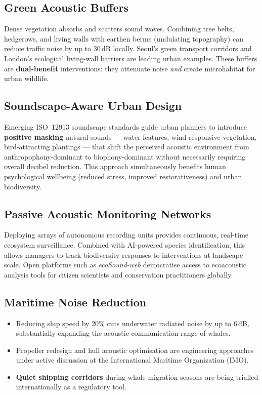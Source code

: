 \documentclass[12pt, a4paper]{article}
\begin{document}
\subsection{Green Acoustic Buffers}

Dense vegetation absorbs and scatters sound waves. Combining tree belts, hedgerows, and
living walls with earthen berms (undulating topography) can reduce traffic noise by up to
30\,dB locally. Seoul's green transport corridors and London's ecological living-wall barriers
are leading urban examples. These buffers are \textbf{dual-benefit} interventions: they
attenuate noise \textit{and} create microhabitat for urban wildlife.

\subsection{Soundscape-Aware Urban Design}

Emerging ISO~12913 soundscape standards guide urban planners to introduce \textbf{positive
masking} natural sounds --- water features, wind-responsive vegetation, bird-attracting
plantings --- that shift the perceived acoustic environment from anthropophony-dominant to
biophony-dominant without necessarily requiring overall decibel reduction. This approach
simultaneously benefits human psychological wellbeing (reduced stress, improved restorativeness)
and urban biodiversity.

\subsection{Passive Acoustic Monitoring Networks}

Deploying arrays of autonomous recording units provides continuous, real-time ecosystem
surveillance. Combined with AI-powered species identification, this allows managers to track
biodiversity responses to interventions at landscape scale. Open platforms such as
\textit{ecoSound-web} democratise access to ecoacoustic analysis tools for citizen scientists
and conservation practitioners globally.

\subsection{Maritime Noise Reduction}

\begin{itemize}[itemsep=3pt]
  \item Reducing ship speed by 20\% cuts underwater radiated noise by up to 6\,dB, substantially
        expanding the acoustic communication range of whales.
  \item Propeller redesign and hull acoustic optimisation are engineering approaches under active
        discussion at the International Maritime Organization (IMO).
  \item \textbf{Quiet shipping corridors} during whale migration seasons are being trialled
        internationally as a regulatory tool.
\end{itemize}
\end{document}
